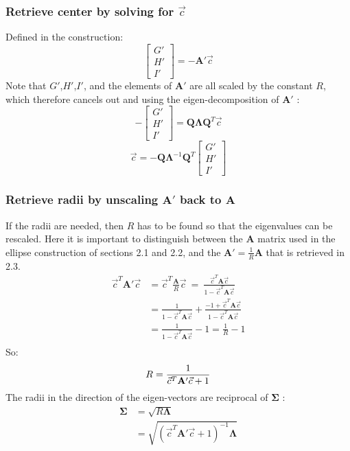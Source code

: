 \documentclass{article}
\def\mat#1{\mathbf{#1}}
\begin{document}
\subsubsection{Retrieve center by solving for $\vec{c}$}
Defined in the construction:
\begin{equation}
\left[\begin{smallmatrix} G'\\H'\\I' \end{smallmatrix}\right] = -\mat{A'}\vec{c}
\end{equation}
Note that $G'$,$H'$,$I'$, and the elements of $\mat{A'}$ are all scaled by the constant $R$, which therefore cancels out and using the eigen-decomposition of $\mat{A'}$ :
\begin{equation}
-\left[\begin{smallmatrix} G'\\H'\\I' \end{smallmatrix}\right] = \mat{Q}\mat{\Lambda}\mat{Q}^{T}\vec{c}
\end{equation}
\begin{equation}
\vec{c} = -\mat{Q}\mat{\Lambda}^{-1}\mat{Q}^{T}\left[\begin{smallmatrix} G'\\H'\\I' \end{smallmatrix}\right] 
\end{equation}
\subsubsection{Retrieve radii by unscaling $\mat{A'}$ back to $\mat{A}$}
If the radii are needed, then $R$ has to be found so that the
eigenvalues can be rescaled. Here it is important to distinguish
between the $\mat{A}$ matrix used in the ellipse construction of
sections 2.1 and 2.2, and the $\mat{A'}=\frac{1}{R}\mat{A}$ that is retrieved in 2.3.
\begin{equation}
\begin{split}
\vec{c}^T \mat{A'} \vec{c} &= \vec{c}^T \frac{\mat{A}}{R} \vec{c} ~=~\frac{\vec{c}^T\mat{A}\vec{c}}{1 - \vec{c}^T\mat{A}\vec{c} } \\
&= \frac{1}{1 - \vec{c}^T\mat{A}\vec{c}} + \frac{-1 + \vec{c}^T\mat{A}\vec{c}}{1-\vec{c}^T\mat{A}\vec{c}}\\
&= \frac{1}{1 - \vec{c}^T\mat{A}\vec{c}} -1 = \frac{1}{R} -1\\
\end{split}
\end{equation}
So:
\begin{equation}
R = \frac{1}{\vec{c}^T\mat{A'}\vec{c} +1}\\
\end{equation}
The radii in the direction of the eigen-vectors are reciprocal of $\mat{\Sigma}$ :
\begin{equation}
\begin{split}
\mat{\Sigma} &= \sqrt{R \mat{\Lambda}}\\
&= \sqrt{ (\vec{c}^T\mat{A'}\vec{c} +1)^{-1} \mat{\Lambda}}
\end{split}
\end{equation}
\end{document}
